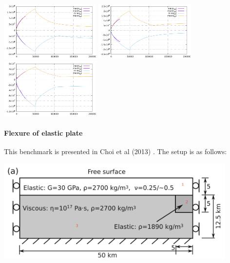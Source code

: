 \begin{center}
\includegraphics[width=5cm]{python_codes/fieldstone_64/results/beam/tauxx.pdf}
\includegraphics[width=5cm]{python_codes/fieldstone_64/results/beam/tauyy.pdf}
\includegraphics[width=5cm]{python_codes/fieldstone_64/results/beam/tauxy.pdf}
\end{center}


\newpage
\paragraph{Flexure of elastic plate}

This benchmark is presented in Choi et al (2013) \cite{chtl13}. 
The setup is as follows:

\begin{center}
\includegraphics[width=12cm]{python_codes/fieldstone_64/images/chtl13a}
\end{center}

